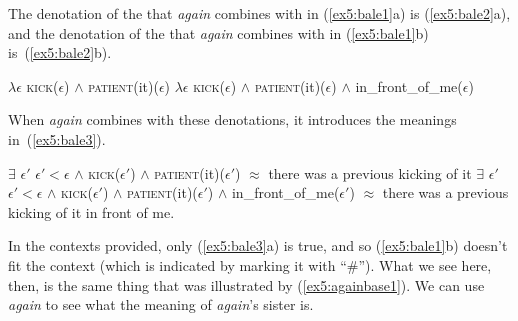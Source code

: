 The denotation of the  that \emph{again} combines with in (\ref{ex5:bale1}a) is (\ref{ex5:bale2}a), and the denotation of the  that \emph{again} combines with in (\ref{ex5:bale1}b) is~(\ref{ex5:bale2}b).
\begin{exe}
	\raggedright
	\ex \label{ex5:bale2} 
	\begin{xlist}
		\ex $\lambda \epsilon$ \textsc{kick}($\epsilon$) $\wedge$ \textsc{patient}(it)($\epsilon$)
		\ex $\lambda \epsilon$ \textsc{kick}($\epsilon$) $\wedge$ \textsc{patient}(it)($\epsilon$) $\wedge$ in\_front\_of\_me($\epsilon$)
	\end{xlist}
\end{exe}
When \emph{again} combines with these denotations, it introduces the meanings in~(\ref{ex5:bale3}).
\begin{exe}
	\raggedright
	\ex \label{ex5:bale3} 
	\begin{xlist}
		\ex $\exists$ $\epsilon '$ $\epsilon ' < \epsilon $ $\wedge$ \textsc{kick}($\epsilon '$) $\wedge$ \textsc{patient}(it)($\epsilon '$)
		\sn $\approx$ there was a previous kicking of it
		\ex $\exists$ $\epsilon '$ $\epsilon' < \epsilon$ $\wedge$ \textsc{kick}($\epsilon '$) $\wedge$ \textsc{patient}(it)($\epsilon '$) $\wedge$ in\_front\_of\_me($\epsilon '$)
		\sn $\approx$ there was a previous kicking of it in front of me.
	\end{xlist}
\end{exe}
In the contexts provided, only (\ref{ex5:bale3}a) is true, and so (\ref{ex5:bale1}b) doesn't fit the context (which is indicated by marking it with ``\#''). What we see here, then, is the same thing that was illustrated by (\ref{ex5:againbase1}). We can use \emph{again} to see what the meaning of \emph{again}'s sister is.

